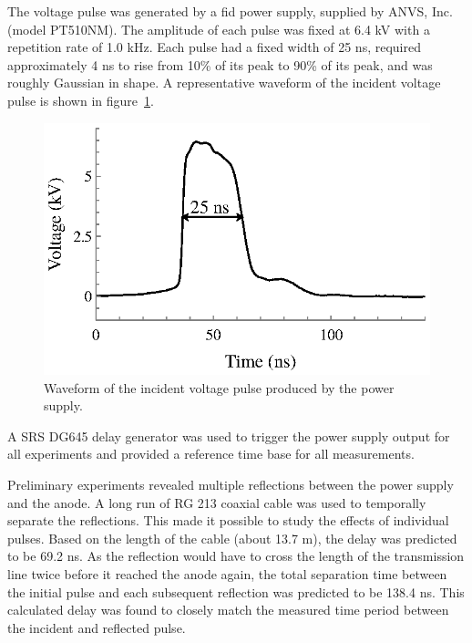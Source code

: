 The voltage pulse was generated by a \acs{fid} power supply, supplied by ANVS,
Inc. (model PT510NM). The amplitude of each pulse was fixed at 6.4 kV with a
repetition rate of 1.0 kHz. Each pulse had a fixed width of 25 ns, required
approximately 4 ns to rise from 10\% of its peak to 90\% of its peak, and was
roughly Gaussian in shape. A representative waveform of the incident voltage
pulse is shown in figure~\ref{fig:waveform_zoomed}.
\begin{figure}
  \centering
  \includegraphics{./chapters/experiment/figures/waveform_zoomed.eps}
  \caption{Waveform of the incident voltage pulse produced by the power supply.}
  \label{fig:waveform_zoomed}
\end{figure}
A SRS DG645 delay generator was used to trigger the power supply output for all
experiments and provided a reference time base for all measurements.

Preliminary experiments revealed multiple reflections between the power supply
and the anode. A long run of RG 213 coaxial cable was used to temporally
separate the reflections. This made it possible to study the effects of
individual pulses. Based on the length of the cable (about 13.7 m), the delay
was predicted to be 69.2 ns. As the reflection would have to cross the length of
the transmission line twice before it reached the anode again, the total
separation time between the initial pulse and each subsequent reflection was
predicted to be 138.4 ns. This calculated delay was found to closely match the
measured time period between the incident and reflected pulse.


